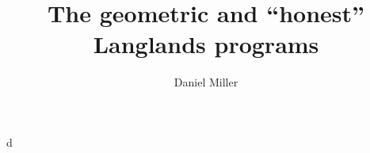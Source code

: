 \documentclass{article}
\title{The geometric and ``honest'' Langlands programs}
\author{Daniel Miller}
\begin{document}
\maketitle





d
\end{document}
